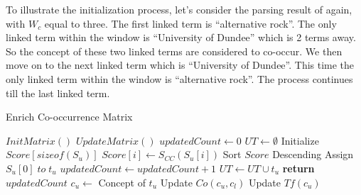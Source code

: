 %

To illustrate the initialization process, let's consider the parsing result of
 again, with $W_c$ equal to three. The first linked
term is ``alternative rock''. The only linked term within the window
is ``University of Dundee'' which is 2 terms away. So the concept of these two
linked terms are considered to co-occur. We then move on
to the next linked term which is ``University of Dundee''. This time the only
linked term within the window is ``alternative rock''. The process continues
till the last linked term.

\begin{algorithm}[th]
\caption{Enrich Co-occurrence Matrix}
\label{enrich}
\begin{algorithmic}[1]
\State $InitMatrix\left(\right)$
\State $UpdateMatrix\left(\right)$
\EndWhile
\EndProcedure
\Statex
{}
\State $updatedCount \leftarrow 0$
\State $UT \leftarrow \emptyset$
\State Initialize $Score[sizeof(S_u)]$
\State $Score[i] \leftarrow S_{CC}\left(S_u[i]\right)$
\EndFor
\State Sort $Score$ Descending
\State Assign $S_u[0]\;to\;t_u$
\State $updatedCount \leftarrow updatedCount+1$
\State $UT \leftarrow UT \cup t_u$
\EndIf
\EndFor
\EndFor
\State \textbf{return} $updatedCount$
\EndFunction
\Statex
{}
\State $c_u \leftarrow $ Concept of $t_u$
\State Update $Co\left(c_u,c_l\right)$
\State Update $Tf\left(c_u\right)$
\EndFor
\EndFor
\EndProcedure
\end{algorithmic}
\end{algorithm}


